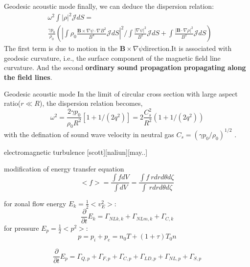 \documentclass{beamer}
\begin{document}
\begin{frame}{Geodesic acoustic mode}
	finally, we can deduce the dispersion relation:
	\begin{equation}
	\begin{aligned}
		& \omega^2\int{|\rho|^2}\mathcal{J}dS= \\ 
		& \frac{\gamma{p_0}}{\rho_0}( |\int\rho_0\frac{\pmb{B}\times\nabla\psi\cdot\nabla{B^2}}{B^4}\mathcal{J}dS|^2/\int\frac{|\nabla\psi|^2}{B^2}\mathcal{J}dS + \int\frac{|\pmb{B}\cdot\nabla\rho|^2}{B^2}\mathcal{J}dS )
	\end{aligned}
	\end{equation}
	The first term is due to motion in the $\pmb{B}\times\nabla\psi$direction.It is associated with geodesic curvature, i.e., the surface component of the magnetic field line curvature. And the second \textbf{ordinary sound propagation propagating along the field lines}.
\end{frame}


\begin{frame}{Geodesic acoustic mode}
	In the limit of circular cross section with large aspect ratio($r\ll R$), the dispersion relation becomes,
	\begin{equation}
	\omega^2=\frac{2\gamma{p_0}}{\rho_0{R}^2}[1+1/(2q^2)]=2\frac{C_s^2}{R^2}(1+1/(2q^2))
	\end{equation}
	with the defination of sound wave velocity in neutral gas $C_s=(\gamma{p_0}/\rho_0)^{1/2}$ .
\end{frame}


\begin{frame}{electromagnetic turbulence}
	[scott][naliun][may..]
\end{frame}


\begin{frame}{modification of energy transfer equation}
	\begin{equation}
	<f>=\frac{\int{f}dV}{\int{dV}}
	=\frac{\int{f}\ rdrd\theta{d\zeta}}{\int\ rdrd\theta{d\zeta}}
	\end{equation}

	for zonal flow energy $E_k=\frac{1}{2}<v_E^2>$:
	\begin{equation}
	\frac{\partial}{\partial{t}}E_k=\Gamma_{NLk,k}+\Gamma_{NLm,k}+\Gamma_{C,k}
	\end{equation}
	for pressure $E_p=\frac{1}{2}<p^2>$:
	\begin{equation}
	p=p_i+p_e=n_0T+(1+\tau)T_0{n}
	\end{equation}
	
	\begin{equation}
	\frac{\partial}{\partial{t}}E_p=\Gamma_{Q,p}+\Gamma_{F,p}+\Gamma_{C,p}+\Gamma_{LD,p}+\Gamma_{NL,p}+\Gamma_{S,p}
	\end{equation}
\end{frame}
\end{document}
